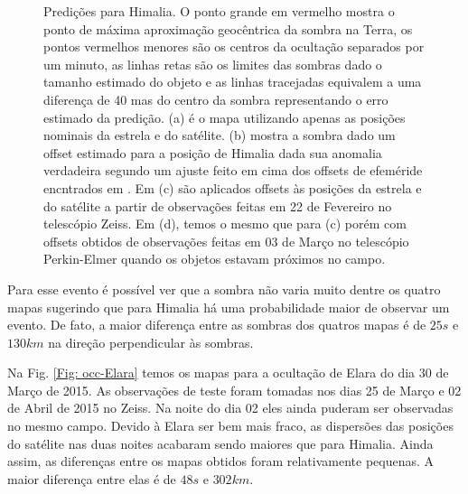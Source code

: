 \documentclass[12pt,a4paper]{monografia}
\begin{document}
\begin{figure}[h!]
\begin{centering}
\caption{Predições para Himalia. O ponto grande em vermelho mostra o ponto de máxima aproximação geocêntrica da sombra na Terra, os pontos vermelhos menores são os centros da ocultação separados por um minuto, as linhas retas são os limites das sombras dado o tamanho estimado do objeto e as linhas tracejadas equivalem a uma diferença de 40 mas do centro da sombra representando o erro estimado da predição. (a) é o mapa utilizando apenas as posições nominais da estrela e do satélite. (b) mostra a sombra dado um offset estimado para a posição de Himalia dada sua anomalia verdadeira segundo um ajuste feito em cima dos offsets de efeméride encntrados em \cite{GomesJunior2015-Irregular}. Em (c) são aplicados offsets às posições da estrela e do satélite a partir de observações feitas em 22 de Fevereiro no telescópio Zeiss. Em (d), temos o mesmo que para (c) porém com offsets obtidos de observações feitas em 03 de Março no telescópio Perkin-Elmer quando os objetos estavam próximos no campo.}
\label{Fig: occ-Himalia}
\end{centering}
\end{figure}

Para esse evento é possível ver que a sombra não varia muito dentre os quatro mapas sugerindo que para Himalia há uma probabilidade maior de observar um evento. De fato, a maior diferença entre as sombras dos quatros mapas é de $25 s$ e $130 km$ na direção perpendicular às sombras.

Na Fig. \ref{Fig: occ-Elara} temos os mapas para a ocultação de Elara do dia 30 de Março de 2015. As observações de teste foram tomadas nos dias 25 de Março e 02 de Abril de 2015 no Zeiss. Na noite do dia 02 eles ainda puderam ser observadas no mesmo campo. Devido à Elara ser bem mais fraco, as dispersões das posições do satélite nas duas noites acabaram sendo maiores que para Himalia. Ainda assim, as diferenças entre os mapas obtidos foram relativamente pequenas. A maior diferença entre elas é de $48 s$ e $302 km$.
\end{document}
